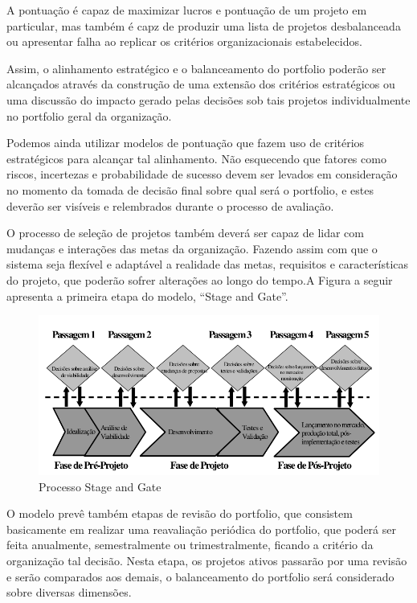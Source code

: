 \documentclass[12pt,a4paper,ruledheader,tocpage=prefix,floatnumber=continuous,pagestart=folhaderosto,font=times]{abnt}
\begin{document}
A pontuação é capaz de maximizar lucros e pontuação de um projeto em particular, mas também é capz de produzir uma lista de projetos desbalanceada ou apresentar
falha ao replicar os critérios organizacionais estabelecidos.

Assim, o alinhamento estratégico e o balanceamento do portfolio poderão ser alcançados através da construção de uma extensão dos critérios estratégicos ou
uma discussão do impacto gerado pelas decisões sob tais projetos individualmente no portfolio geral da organização. 

Podemos ainda utilizar modelos de pontuação que fazem uso de critérios estratégicos para alcançar tal alinhamento. Não esquecendo que fatores como riscos,
incertezas e probabilidade de sucesso devem ser levados em consideração no momento da tomada de decisão final sobre qual será o portfolio, e estes 
deverão ser visíveis e relembrados durante o processo de avaliação.

O processo de seleção de projetos também deverá ser capaz de lidar com mudanças e interações das metas da organização. Fazendo assim com que o sistema seja 
flexível e adaptável a realidade das metas, requisitos e características do projeto, que poderão sofrer alterações ao longo do tempo.A Figura a seguir 
apresenta a primeira etapa do modelo, ``Stage and Gate''.

\begin{figure}[H]
\centering
\includegraphics[width=.9\textwidth]{stage_and_gate.png}
\caption{Processo Stage and Gate}
\end{figure}

O modelo prevê também etapas de revisão do portfolio, que consistem basicamente em realizar uma reavaliação periódica do portfolio, que poderá ser feita
anualmente, semestralmente ou trimestralmente, ficando a critério da organização tal decisão. Nesta etapa, os projetos ativos passarão por uma revisão
e serão comparados aos demais, o balanceamento do portfolio será considerado sobre diversas dimensões. 
\end{document}

